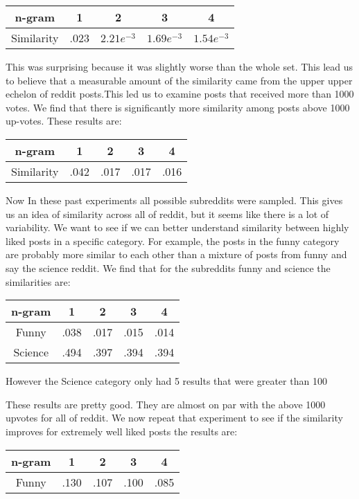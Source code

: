 \documentclass[12pt]{article}
\numberwithin{equation}{section}
\begin{document}
\begin{table}[h!]
	  \begin{tabular}{c | c c c c}
	  n-gram & 1 & 2 & 3 & 4\\
	  \hline
	  Similarity & .023 & $2.21e^{-3}$ & $1.69e^{-3}$ & $1.54e^{-3}$
	  \end{tabular}
	\end{table}
	This was surprising because it was slightly worse than the whole set.  This lead us to believe that a measurable amount of the similarity came from the upper upper echelon of reddit posts.This led us to examine posts that received more than 1000 votes.  We find that there is significantly more similarity among posts above 1000 up-votes.  These results are:\newline
	
	\begin{table}[h!]
	  \begin{tabular}{c | c c c c}
	  n-gram & 1 & 2 & 3 & 4\\
	  \hline
	  Similarity & .042 & .017 & .017 & .016
	  \end{tabular}
	\end{table}
	
	Now In these past experiments all possible subreddits were sampled.  This gives us an idea of similarity across all of reddit, but it seems like there is a lot of variability.  We want to see if we can better understand similarity between highly liked posts in a specific category.  For example, the posts in the funny category are probably more similar to each other than a mixture of posts from funny and say the science reddit.  We find that for the subreddits funny and science the similarities are:
	
		\begin{table}[h!]
	  \begin{tabular}{c | c c c c}
	  n-gram & 1 & 2 & 3 & 4\\
	  \hline
	  Funny & .038 & .017 & .015 & .014\\
	  Science & .494 & .397 & .394 & .394\\
	  \end{tabular}
	\end{table}
	However the Science category only had 5 results that were greater than 100
	
These results are pretty good.  They are almost on par with the above 1000 upvotes for all of reddit.  We now repeat that experiment to see if the similarity improves for extremely well liked posts the results are:

	\begin{table}[h!]
	  \begin{tabular}{c | c c c c}
	  n-gram & 1 & 2 & 3 & 4\\
	  \hline
	  Funny & .130 & .107 & .100 & .085\\
	  \end{tabular}
	\end{table}
	
	
	
\end{document}
